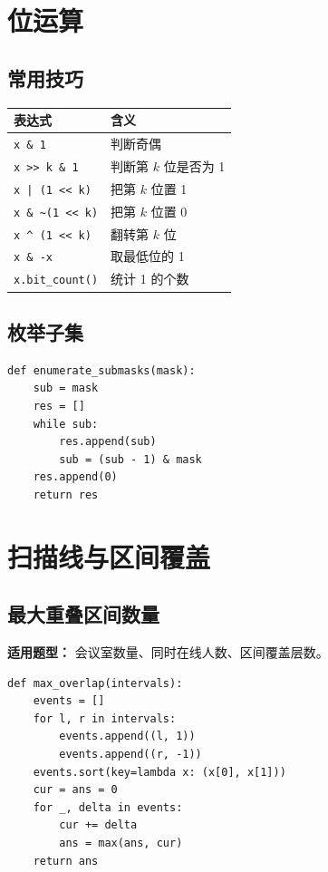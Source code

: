 \documentclass[UTF8,a4paper,14pt]{ctexart}
\begin{document}
\section{位运算}

\subsection{常用技巧}

\begin{longtable}{p{}p{}}
\toprule
\textbf{表达式} & \textbf{含义} \\
\midrule
\texttt{x \& 1} & 判断奇偶 \\
\texttt{x >> k \& 1} & 判断第 $k$ 位是否为 1 \\
\texttt{x | (1 << k)} & 把第 $k$ 位置 1 \\
\texttt{x \& \textasciitilde(1 << k)} & 把第 $k$ 位置 0 \\
\texttt{x \^{} (1 << k)} & 翻转第 $k$ 位 \\
\texttt{x \& -x} & 取最低位的 1 \\
\texttt{x.bit\_count()} & 统计 1 的个数 \\
\bottomrule
\end{longtable}

\subsection{枚举子集}

\begin{lstlisting}
def enumerate_submasks(mask):
    sub = mask
    res = []
    while sub:
        res.append(sub)
        sub = (sub - 1) & mask
    res.append(0)
    return res
\end{lstlisting}

\section{扫描线与区间覆盖}

\subsection{最大重叠区间数量}

\textbf{适用题型：}
会议室数量、同时在线人数、区间覆盖层数。

\begin{lstlisting}
def max_overlap(intervals):
    events = []
    for l, r in intervals:
        events.append((l, 1))
        events.append((r, -1))
    events.sort(key=lambda x: (x[0], x[1]))
    cur = ans = 0
    for _, delta in events:
        cur += delta
        ans = max(ans, cur)
    return ans
\end{lstlisting}
\end{document}
